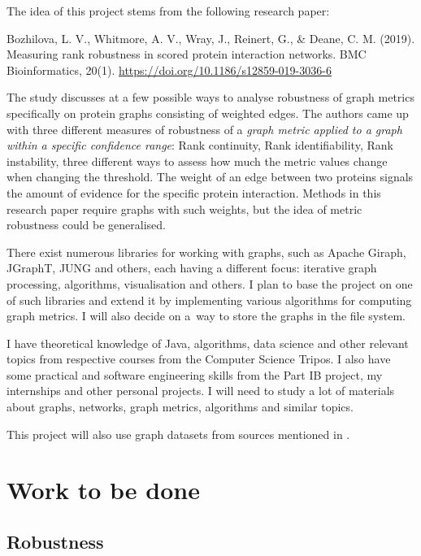 \documentclass[12pt,a4paper,twoside]{article}
\begin{document}
    The idea of this project stems from the following research paper:
    
    \begin{adjustwidth}{1cm}{}
    Bozhilova, L. V., Whitmore, A. V., Wray, J., Reinert, G., \& Deane, C. M. (2019). Measuring rank robustness in scored protein interaction networks. BMC Bioinformatics, 20(1). \url{https://doi.org/10.1186/s12859-019-3036-6}
    \end{adjustwidth}
    
    The study discusses at a few possible ways to analyse robustness of graph metrics specifically on protein graphs consisting of weighted edges. The authors came up with three different measures of robustness of a \textit{graph metric applied to a graph within a specific confidence range}: Rank continuity, Rank identifiability, Rank instability, three different ways to assess how much the metric values change when changing the threshold. The weight of an edge between two proteins signals the amount of evidence for the specific protein interaction. Methods in this research paper require graphs with such weights, but the idea of metric robustness could be generalised.

    There exist numerous libraries for working with graphs, such as Apache Giraph, JGraphT, JUNG and others, each having a different focus: iterative graph processing, algorithms, visualisation and others. I plan to base the project on one of such libraries and extend it by implementing various algorithms for computing graph metrics. I will also decide on a~way to store the graphs in the file system.
    
    I have theoretical knowledge of Java, algorithms, data science and other relevant topics from respective courses from the Computer Science Tripos. I also have some practical and software engineering skills from the Part IB project, my internships and other personal projects. I will need to study a lot of materials about graphs, networks, graph metrics, algorithms and similar topics.
    
    This project will also use graph datasets from sources mentioned in .

\section*{Work to be done}

    \subsection*{Robustness}
\end{document}
